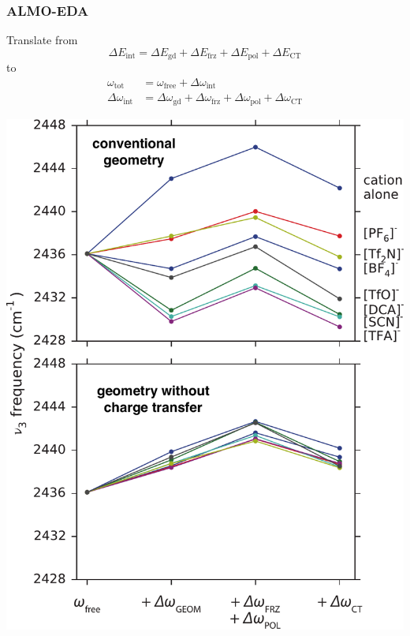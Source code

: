 \documentclass{beamer}
\begin{document}
\begin{frame}
  \frametitle{ALMO-EDA}
  Translate from
  \begin{equation*}
    \Delta E_{\text{int}} = \Delta E_{\text{gd}} + \Delta E_{\text{frz}} + \Delta E_{\text{pol}} + \Delta E_{\text{CT}}
  \end{equation*}
  to
  \begin{equation*}
    \begin{aligned}
      \omega_{\text{tot}} &= \omega_{\text{free}} + \Delta \omega_{\text{int}} \\
      \Delta \omega_{\text{int}} &= \Delta \omega_{\text{gd}} + \Delta \omega_{\text{frz}} + \Delta \omega_{\text{pol}} + \Delta \omega_{\text{CT}}
    \end{aligned}
  \end{equation*}
\end{frame}

\begin{frame}
  \centering
  \includegraphics[scale=0.35]{./figures/ionic_liquid_geometry_dependence_on_ct.pdf}
\end{frame}
\end{document}
